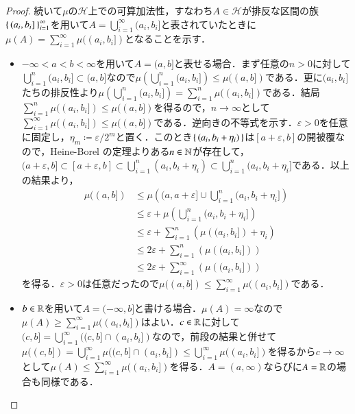 \begin{proof}
続いて$\mu$の$\mathcal{H}$上での可算加法性，すなわち$A \in \mathcal{H}$が排反な区間の族$\set{(a_i,b_i]}_{i=1}^\infty$を用いて$A = \bigcup_{i=1}^\infty (a_i,b_i]$と表されていたときに$\mu(A) = \sum_{i=1}^\infty \mu((a_i,b_i])$となることを示す．
\begin{itemize}
\item $-\infty < a < b < \infty$を用いて$A=(a,b]$と表せる場合．まず任意の$n>0$に対して$\bigcup_{i=1}^n (a_i,b_i] \subset (a,b]$なので$\mu\left(\bigcup_{i=1}^n (a_i,b_i]\right) \leq \mu((a,b])$である．更に$(a_i,b_i]$たちの排反性より$\mu\left(\bigcup_{i=1}^n (a_i,b_i]\right) = \sum_{i=1}^n \mu((a_i,b_i])$である．結局$\sum_{i=1}^n \mu((a_i,b_i]) \leq \mu((a,b])$を得るので，$n \to \infty$として$\sum_{i=1}^\infty \mu((a_i,b_i]) \leq \mu((a,b])$である．逆向きの不等式を示す．$\varepsilon >0$を任意に固定し，$\eta_m \coloneqq \varepsilon / 2^m$と置く．このとき$\set{(a_i,b_i+\eta_i)}$は$[a+\varepsilon,b]$の開被覆なので，Heine-Borel の定理よりある$n \in \mathbb{N}$が存在して，$(a+\varepsilon,b] \subset [a+\varepsilon,b] \subset \bigcup_{i=1}^n (a_i, b_i+ \eta_i) \subset \bigcup_{i=1}^n (a_i, b_i+ \eta_i]$である．以上の結果より，
\begin{align}
\mu((a,b]) &\leq \mu\left( (a,a+\varepsilon] \cup \bigcup_{i=1}^n (a_i,b_i+\eta_i] \right) \\
&\leq \varepsilon + \mu\left( \bigcup_{i=1}^n (a_i,b_i+\eta_i] \right) \\
&\leq \varepsilon + \sum_{i=1}^n\left( \mu\left(  (a_i,b_i] \right) + \eta_i \right) \\
&\leq 2\varepsilon + \sum_{i=1}^n\left( \mu\left(  (a_i,b_i] \right) \right) \\
&\leq 2\varepsilon + \sum_{i=1}^\infty\left( \mu\left(  (a_i,b_i] \right) \right)
\end{align}を得る．$\varepsilon > 0$は任意だったので$\mu((a,b]) \leq \sum_{i=1}^\infty \mu((a_i,b_i])$である．
\item $b \in \mathbb{R}$を用いて$A = (-\infty, b]$と書ける場合．$\mu(A) = \infty$なので$\mu(A) \geq \sum_{i=1}^\infty \mu((a_i,b_i])$はよい．$c \in \mathbb{R}$に対して$(c,b] = \bigcup_{i=1}^\infty ((c,b] \cap (a_i,b_i])$なので，前段の結果と併せて$\mu((c,b]) = \bigcup_{i=1}^\infty \mu((c,b] \cap (a_i,b_i]) \leq \bigcup_{i=1}^\infty \mu((a_i,b_i])$を得るから$c \to \infty$として$\mu(A) \leq \sum_{i=1}^\infty \mu((a_i,b_i])$を得る．$A=(a,\infty)$ならびに$A = \mathbb{R}$の場合も同様である．
\end{itemize}


\end{proof}

